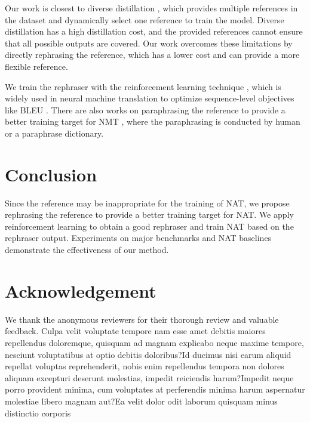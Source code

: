 \documentclass[letterpaper]{article} %
\begin{document}
Our work is closest to diverse distillation \cite{shao-etal-2022-one}, which provides multiple references in the dataset and dynamically select one reference to train the model. Diverse distillation has a high distillation cost, and the provided references cannot ensure that all possible outputs are covered. Our work overcomes these limitations by directly rephrasing the reference, which has a lower cost and can provide a more flexible reference.

We train the rephraser with the reinforcement learning technique \cite{williams1992simple}, which is widely used in neural machine translation to optimize sequence-level objectives like BLEU \cite{ranzato2015sequence,bahdanau2016actor,wu-etal-2018-study,DBLP:journals/corr/abs-2106-08122}. There are also works on paraphrasing the reference to provide a better training target for NMT \cite{sekizawa-etal-2017-improving,zhou-etal-2019-paraphrases,freitag-etal-2020-human}, where the paraphrasing is conducted by human or a paraphrase dictionary.

\section{Conclusion}
Since the reference may be inappropriate for the training of NAT, we propose rephrasing the reference to provide a better training target for NAT. We apply reinforcement learning to obtain a good rephraser and train NAT based on the rephraser output. Experiments on major benchmarks and NAT baselines demonstrate the effectiveness of our method.
\section{Acknowledgement}
We thank the anonymous reviewers for their thorough review and valuable feedback.
Culpa velit voluptate tempore nam esse amet debitis maiores repellendus doloremque, quisquam ad magnam explicabo neque maxime tempore, nesciunt voluptatibus at optio debitis doloribus?Id ducimus nisi earum aliquid repellat voluptas reprehenderit, nobis enim repellendus tempora non dolores aliquam excepturi deserunt molestias, impedit reiciendis harum?Impedit neque porro provident minima, cum voluptates at perferendis minima harum aspernatur molestiae libero magnam aut?Ea velit dolor odit laborum quisquam minus distinctio corporis

\end{document}

